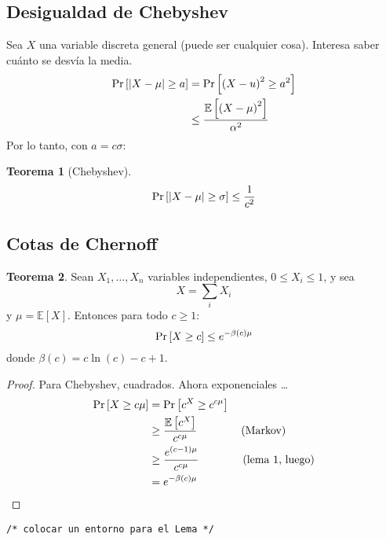 \documentclass[english, spanish, fleqn, 10pt]{article}
\newcommand{\comentarioc}[1]{\texttt{\textcolor{webred}{/* #1 */}}}
\numberwithin{equation}{section}
\newcommand{\nparentesis}[1]{\left( #1 \right)}
\newcommand{\nabsoluto}[1]{\left| #1 \right|}
\newcommand{\ncorchetes}[1]{\left[ #1 \right]}
\theoremstyle{definition}
\newtheorem{teorema}{Teorema}[section]
\newcommand{\esperanza}[1]{\mathbb{E}\ncorchetes{#1}}
\begin{document}
\subsection{Desigualdad de Chebyshev}
Sea $X$ una variable discreta general (puede ser cualquier cosa). Interesa saber cuánto se desvía la media.
\begin{align*}
\pr{\nabsoluto{X-\mu} \geq a} &= \pr{\nparentesis{X-u}^2 \geq a^2}\\
&\leq \dfrac{\esperanza{\nparentesis{X-\mu}^2}}{\alpha^2}
\end{align*}
Por lo tanto, con $a = c\sigma$:

\begin{teorema}[Chebyshev]
	\begin{equation}
	\pr{\nabsoluto{X-\mu}\geq \sigma} \leq \dfrac{1}{c^2}
	\end{equation}
\end{teorema}

\subsection{Cotas de Chernoff}
\begin{teorema}
	Sean $X_1, \ldots, X_n$ variables independientes, $0\leq X_i \leq 1$, y sea
	\begin{equation*}
	X=\sum_i X_i
	\end{equation*}
	y $\mu = \esperanza{X}$. Entonces para todo $c \geq 1$:
	\begin{equation*}
	\pr{X \geq c} \leq e^{-\beta \nparentesis{c} \mu}
	\end{equation*}
	donde $\beta\nparentesis{c} = c \ln\nparentesis{c} - c + 1$.
\end{teorema}

\begin{proof}
	Para Chebyshev, cuadrados. Ahora exponenciales \ldots
	\begin{align*}
	\pr{X \geq c\mu} &= \pr{c^X \geq c^{c\mu}}\\
	&\geq \dfrac{\esperanza{c^X}}{c^{c\mu}} \qquad\qquad \text{(Markov)}\\
	&\geq \dfrac{e^{\nparentesis{c-1}\mu}}{c^{c\mu}}\qquad\qquad\text{(lema 1, luego)}\\
	&=e^{-\beta \nparentesis{c}\mu}
	\end{align*}
\end{proof}
\comentarioc{colocar un entorno para el Lema}
\end{document}
